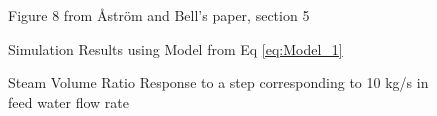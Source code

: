         \begin{figure}[ht]
            \begin{center}
                
                Figure 8 from \r{A}str\"{o}m and Bell's paper, section 5 \cite{Astrom}
                
                
                Simulation Results using Model from Eq \eqref{eq:Model_1}
                
                \caption{Steam Volume Ratio Response to a step corresponding to 10 kg/s in feed water flow rate}
                \label{fig:Fig8E}
            \end{center}
        \end{figure}  %
